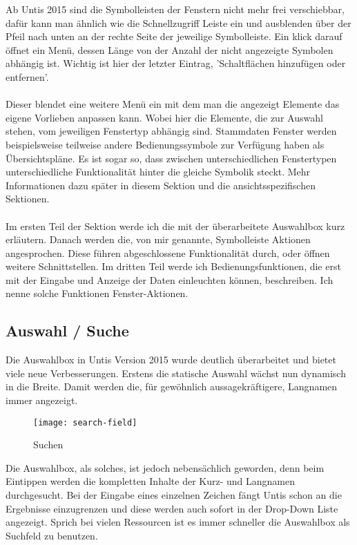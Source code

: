 Ab Untis 2015 sind die Symbolleisten der Fenstern nicht mehr frei verschiebbar, dafür kann man ähnlich wie die Schnellzugriff Leiste ein und ausblenden über der Pfeil nach unten an der rechte Seite der jeweilige Symbolleiste. Ein klick darauf öffnet ein Menü, dessen Länge von der Anzahl der nicht angezeigte Symbolen abhängig ist. Wichtig ist hier der letzter Eintrag, 'Schaltflächen hinzufügen oder entfernen'.\\
\\
Dieser blendet eine weitere Menü ein mit dem man die angezeigt Elemente das eigene Vorlieben anpassen kann. Wobei hier die Elemente, die zur Auswahl stehen, vom jeweiligen Fenstertyp abhängig sind. Stammdaten Fenster werden beispielsweise teilweise andere Bedienungssymbole zur Verfügung haben als Übersichtspläne. Es ist sogar so, dass zwischen unterschiedlichen Fenstertypen unterschiedliche Funktionalität hinter die gleiche Symbolik steckt. Mehr Informationen dazu später in diesem Sektion und die ansichtsspezifischen Sektionen.\\
\\
Im ersten Teil der Sektion werde ich die mit der überarbeitete Auswahlbox kurz erläutern. Danach werden die, von mir genannte, Symbolleiste Aktionen angesprochen. Diese führen abgeschlossene Funktionalität durch, oder öffnen weitere Schnittstellen. Im dritten Teil werde ich Bedienungsfunktionen, die erst mit der Eingabe und Anzeige der Daten einleuchten können, beschreiben. Ich nenne solche Funktionen Fenster-Aktionen.

\subsection{Auswahl / Suche}

Die Auswahlbox in Untis Version 2015 wurde deutlich überarbeitet und bietet viele neue Verbesserungen. Erstens die statische Auswahl wächst nun dynamisch in die Breite. Damit werden die, für gewöhnlich aussagekräftigere, Langnamen immer angezeigt.\\


\begin{wrapfigure}{r}{.4\textwidth}
	\vspace{-13pt}
	\texttt{[image: search-field]}
	\vspace{-5pt}
	\caption{Suchen}
	\label{fig:search-field}
\end{wrapfigure}

\noindent
Die Auswahlbox, als solches, ist jedoch nebensächlich geworden, denn beim Eintippen werden die kompletten Inhalte der Kurz- und Langnamen durchgesucht. Bei der Eingabe eines einzelnen Zeichen fängt Untis schon an die Ergebnisse einzugrenzen und diese werden auch sofort in der Drop-Down Liste angezeigt. Sprich bei vielen Ressourcen ist es immer schneller die Auswahlbox als Suchfeld zu benutzen.


